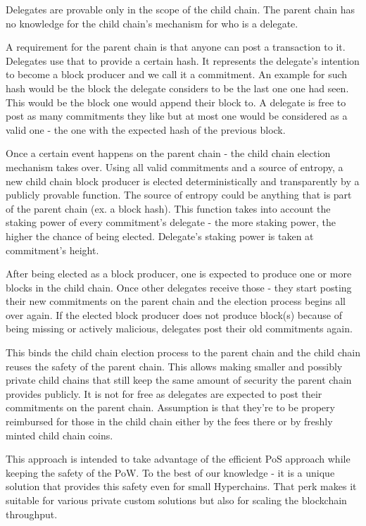 Delegates are provable only in the scope of the child chain. The parent chain has no knowledge for the child chain's mechanism for who is a delegate.

A requirement for the parent chain is that anyone can post a transaction to it. Delegates use that to provide a certain hash. It represents the delegate’s intention to become a block producer and we call it a commitment. An example for such hash would be the block the delegate considers to be the last one one had seen. This would be the block one would append their block to. A delegate is free to post as many commitments they like but at most one would be considered as a valid one - the one with the expected hash of the previous block.

Once a certain event happens on the parent chain - the child chain election mechanism takes over. Using all valid commitments and a source of entropy, a new child chain block producer is elected deterministically and transparently by a publicly provable function. The source of entropy could be anything that is part of the parent chain (ex. a block hash). This function takes into account the staking power of every commitment’s delegate - the more staking power, the higher the chance of being elected. Delegate’s staking power is taken at commitment’s height.

After being elected as a block producer, one is expected to produce one or more blocks in the child chain. Once other delegates receive those - they start posting their new commitments on the parent chain and the election process begins all over again. If the elected block producer does not produce block(s) because of being missing or actively malicious, delegates post their old commitments again.

This binds the child chain election process to the parent chain and the child chain reuses the safety of the parent chain. This allows making smaller and possibly private child chains that still keep the same amount of security the parent chain provides publicly. It is not for free as delegates are expected to post their commitments on the parent chain. Assumption is that they’re to be propery reimbursed for those in the child chain either by the fees there or by freshly minted child chain coins.

This approach is intended to take advantage of the efficient PoS approach while keeping the safety of the PoW. To the best of our knowledge - it is a unique solution that provides this safety even for small Hyperchains. That perk makes it suitable for various private custom solutions but also for scaling the blockchain throughput.

